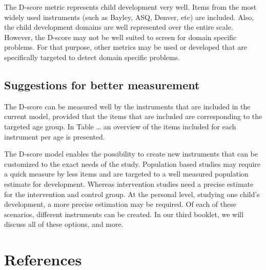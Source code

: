 \documentclass[
]{book}
\begin{document}
The D-score metric represents child development very well. Items from the most widely used instruments (such as Bayley, ASQ, Denver, etc) are included. Also, the child development domains are well represented over the entire scale. However, the D-score may not be well suited to screen for domain specific problems. For that purpose, other metrics may be used or developed that are specifically targeted to detect domain specific problems.

\hypertarget{suggestions-for-better-measurement}{%
\section{Suggestions for better measurement}\label{suggestions-for-better-measurement}}

The D-score can be measured well by the instruments that are included in the current model, provided that the items that are included are corresponding to the targeted age group. In Table \ldots{} an overview of the items included for each instrument per age is presented.

The D-score model enables the possibility to create new instruments that can be customized to the exact needs of the study. Population based studies may require a quick measure by less items and are targeted to a well measured population estimate for development. Whereas intervention studies need a precise estimate for the intervention and control group. At the personal level, studying one child's development, a more precise estimation may be required. Of each of these scenarios, different instruments can be created. In our third booklet, we will discuss all of these options, and more.

\hypertarget{references}{%
\chapter*{References}\label{references}}
\end{document}

